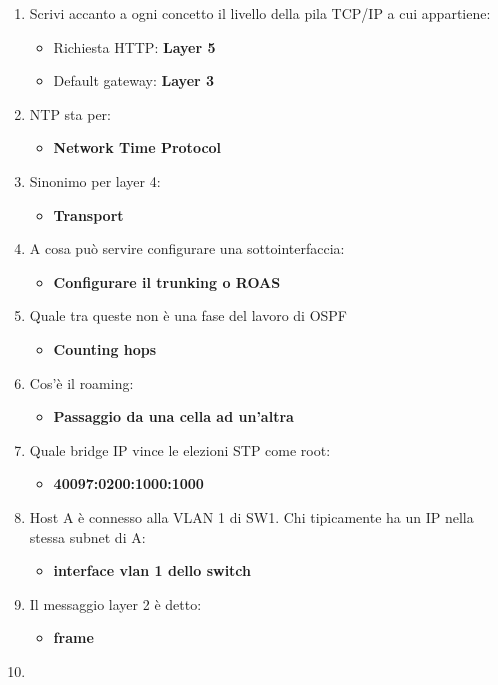 \begin{enumerate}
\def\labelenumi{\arabic{enumi}.}
\setcounter{enumi}{34}
\item
  Scrivi accanto a ogni concetto il livello della pila TCP/IP a cui
  appartiene:

  \begin{itemize}
  \item
    Richiesta HTTP: \textbf{Layer 5}
  \item
    Default gateway: \textbf{Layer 3}
  \end{itemize}
\item
  NTP sta per:

  \begin{itemize}
  \item
    \textbf{Network Time Protocol}
  \end{itemize}
\item
  Sinonimo per layer 4:

  \begin{itemize}
  \item
    \textbf{Transport}
  \end{itemize}
\item
  A cosa può servire configurare una sottointerfaccia:

  \begin{itemize}
  \item
    \textbf{Configurare il trunking o ROAS}
  \end{itemize}
\item
  Quale tra queste non è una fase del lavoro di OSPF

  \begin{itemize}
  \item
    \textbf{Counting hops}
  \end{itemize}
\item
  Cos'è il roaming:

  \begin{itemize}
  \item
    \textbf{Passaggio da una cella ad un'altra}
  \end{itemize}
\item
  Quale bridge IP vince le elezioni STP come root:

  \begin{itemize}
  \item
    \textbf{40097:0200:1000:1000}
  \end{itemize}
\item
  Host A è connesso alla VLAN 1 di SW1. Chi tipicamente ha un IP nella
  stessa subnet di A:

  \begin{itemize}
  \item
    \textbf{interface vlan 1 dello switch}
  \end{itemize}
\item
  Il messaggio layer 2 è detto:

  \begin{itemize}
  \item
    \textbf{frame}
  \end{itemize}
\item
\end{enumerate}

